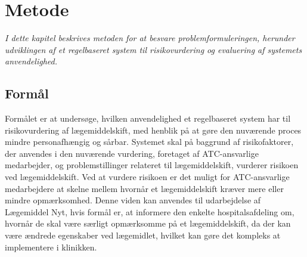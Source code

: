 \chapter{Metode}
\textit{I dette kapitel beskrives metoden for at besvare problemformuleringen, herunder udviklingen af et regelbaseret system til risikovurdering og evaluering af systemets anvendelighed.}

\section{Formål}
Formålet er at undersøge, hvilken anvendelighed et regelbaseret system har til risikovurdering af lægemiddelskift, med henblik på at gøre den nuværende proces mindre personafhængig og sårbar. Systemet skal på baggrund af risikofaktorer, der anvendes i den nuværende vurdering, foretaget af ATC-ansvarlige medarbejder, og problemstillinger relateret til lægemiddelskift, vurderer risikoen ved lægemiddelskift. Ved at vurdere risikoen er det muligt for ATC-ansvarlige medarbejdere at skelne mellem hvornår et lægemiddelskift kræver mere eller mindre opmærksomhed. Denne viden kan anvendes til udarbejdelse af Lægemiddel Nyt, hvis formål er, at informere den enkelte hospitalsafdeling om, hvornår de skal være særligt opmærksomme på et lægemiddelskift, da der kan være ændrede egenskaber ved lægemidlet, hvilket kan gøre det kompleks at implementere i klinikken. 





